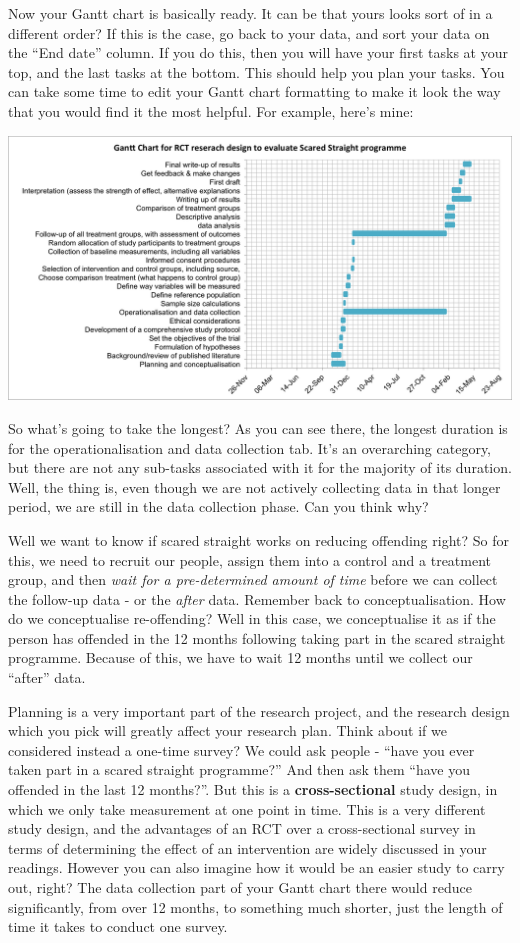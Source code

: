 \documentclass[
]{book}
\begin{document}
Now your Gantt chart is basically ready. It can be that yours looks sort of in a different order? If this is the case, go back to your data, and sort your data on the ``End date'' column. If you do this, then you will have your first tasks at your top, and the last tasks at the bottom. This should help you plan your tasks. You can take some time to edit your Gantt chart formatting to make it look the way that you would find it the most helpful. For example, here's mine:

\includegraphics{imgs/final_gantt.png}

So what's going to take the longest? As you can see there, the longest duration is for the operationalisation and data collection tab. It's an overarching category, but there are not any sub-tasks associated with it for the majority of its duration. Well, the thing is, even though we are not actively collecting data in that longer period, we are still in the data collection phase. Can you think why?

Well we want to know if scared straight works on reducing offending right? So for this, we need to recruit our people, assign them into a control and a treatment group, and then \emph{wait for a pre-determined amount of time} before we can collect the follow-up data - or the \emph{after} data. Remember back to conceptualisation. How do we conceptualise re-offending? Well in this case, we conceptualise it as if the person has offended in the 12 months following taking part in the scared straight programme. Because of this, we have to wait 12 months until we collect our ``after'' data.

Planning is a very important part of the research project, and the research design which you pick will greatly affect your research plan. Think about if we considered instead a one-time survey? We could ask people - ``have you ever taken part in a scared straight programme?'' And then ask them ``have you offended in the last 12 months?''. But this is a \textbf{cross-sectional} study design, in which we only take measurement at one point in time. This is a very different study design, and the advantages of an RCT over a cross-sectional survey in terms of determining the effect of an intervention are widely discussed in your readings. However you can also imagine how it would be an easier study to carry out, right? The data collection part of your Gantt chart there would reduce significantly, from over 12 months, to something much shorter, just the length of time it takes to conduct one survey.
\end{document}
